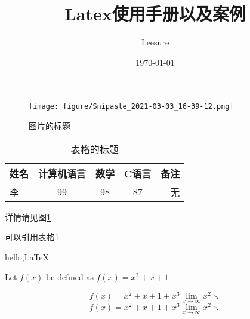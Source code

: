 \documentclass{ctexart}
\title{Latex使用手册以及案例}
\author{Leesure}
\date{\today}
\begin{document}
\maketitle

\begin{figure} 
    \centering
    \texttt{[image: figure/Snipaste\_2021-03-03\_16-39-12.png]}
    \caption{图片的标题}\label{figure_1}
\end{figure}

\begin{table}
    \centering
    \caption{表格的标题}\label{tab_1}
    \begin{tabular}{|l|ccc|r|}
        \hline
        姓名 & 计算机语言 & 数学 & C语言 & 备注\\
        \hline
        李 & 99  & 98 & 87  & 无\\
        \hline
        
    \end{tabular}
    
\end{table}

详情请见图\ref{figure_1}

可以引用表格\ref{tab_1}

hello,\LaTeX



Let  $f(x)$ be defined as $f(x) =x^2+x+1$


    \begin{equation}
        f(x) = x^2+x+1+x^3
        \lim_{x \to \infty}  x^2
        \ddots 
    \end{equation}
    \begin{equation}
        f(x) = x^2+x+1+x^3
        \lim_{x \to \infty}  x^2
        \ddots 
    \end{equation}
    
\end{document}
